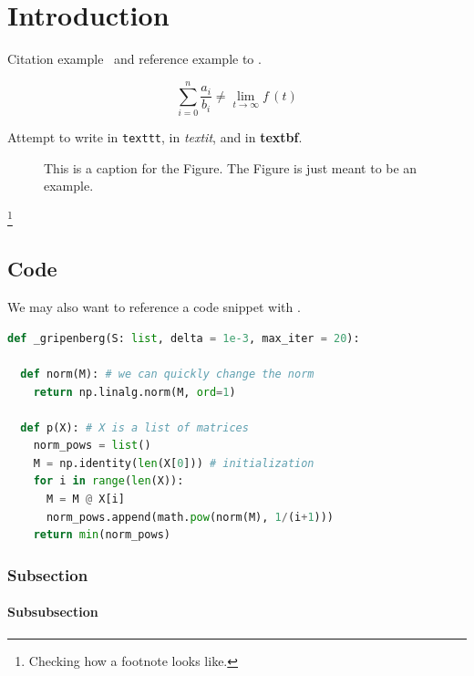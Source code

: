 \chapter{Introduction}

\lipsum[1-1]\xspace
Citation example~\cite{placeholder} and reference example to .

\begin{equation}
\sum_{i=0}^n \frac{a_i}{b_i} \neq \lim_{t\rightarrow\infty} f\,(t)
\end{equation}

Attempt to write in \texttt{texttt}, in \textit{textit}, and in \textbf{textbf}. 

\begin{figure}[htb]
\centering
{}
\caption{This is a caption for the Figure. The Figure is just meant to be an example.}
\label{fig:example}
\end{figure}

\lipsum[4-4]\footnote{Checking how a footnote looks like.}

\section{Code}

\lipsum[5-5]
We may also want to reference a code snippet with .

\begin{lstlisting}[language=Python, caption={Caption of code listing.}, label={src:example}]
def _gripenberg(S: list, delta = 1e-3, max_iter = 20):

  def norm(M): # we can quickly change the norm 
    return np.linalg.norm(M, ord=1)
  
  def p(X): # X is a list of matrices
    norm_pows = list()
    M = np.identity(len(X[0])) # initialization
    for i in range(len(X)):
      M = M @ X[i]
      norm_pows.append(math.pow(norm(M), 1/(i+1)))
    return min(norm_pows)
\end{lstlisting}

\subsection{Subsection}

\lipsum[9-9]

\subsubsection{Subsubsection}

\lipsum[10-10]
